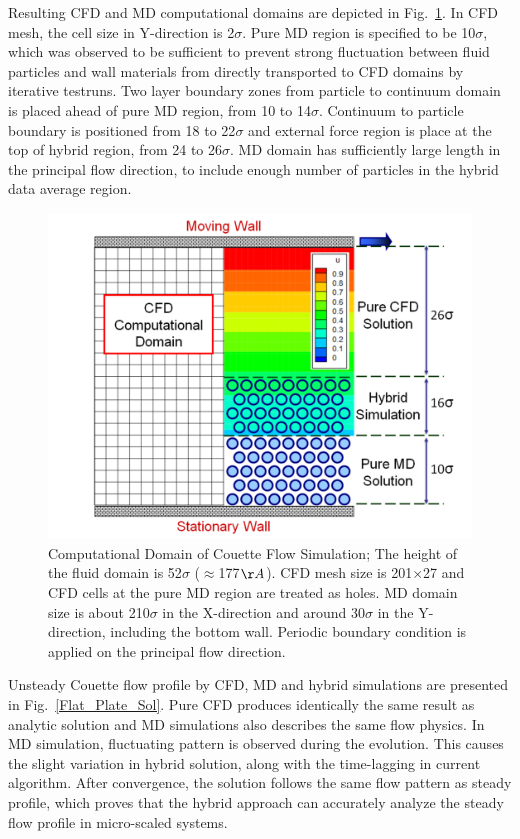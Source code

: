 \documentclass[conference,final]{IEEEtran}
\begin{document}
Resulting CFD and MD computational domains are depicted in Fig.~\ref{Couette_Val_Domain}. In CFD mesh, the cell size in Y-direction is 2$\sigma$. Pure MD region is specified to be 10$\sigma$, which was observed to be sufficient to prevent strong fluctuation between fluid particles and wall materials from directly transported to CFD domains by iterative testruns. Two layer boundary zones from particle to continuum domain is placed ahead of pure MD region, from 10 to 14$\sigma$. Continuum to particle boundary is positioned from 18 to 22$\sigma$ and external force region is place at the top of hybrid region, from 24 to 26$\sigma$. MD domain has sufficiently large length in the principal flow direction, to include enough number of particles in the hybrid data average region.

%
\begin{figure}[ht]
\centering
\includegraphics[width=1.0\linewidth]{Couette_Val_Domain.pdf}
\vskip-0.2cm
\caption{\small Computational Domain of Couette Flow Simulation; The height of the fluid domain is 52$\sigma$ ($\approx$177$\AA$). CFD mesh size is 201$\times$27 and CFD cells at the pure MD region are treated as holes. MD domain size is about 210$\sigma$ in the X-direction and around 30$\sigma$ in the Y-direction, including the bottom wall. Periodic boundary condition is applied on the principal flow direction.}
\label{Couette_Val_Domain}
\end{figure}



Unsteady Couette flow profile by CFD, MD and hybrid simulations are presented in Fig.~\ref{Flat_Plate_Sol}. Pure CFD produces identically the same result as analytic solution and MD simulations also describes the same flow physics. In MD simulation, fluctuating pattern is observed during the evolution. This causes the slight variation in hybrid solution, along with the time-lagging in current algorithm. After convergence, the solution follows the same flow pattern as steady profile, which proves that the hybrid approach can accurately analyze the steady flow profile in micro-scaled systems.
\end{document}

